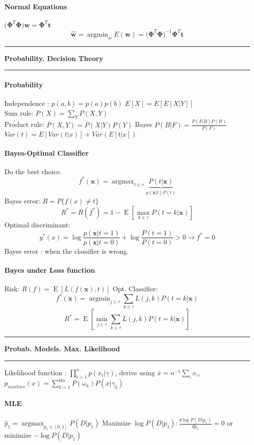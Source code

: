 \documentclass[7pt]{scrartcl}
\newlength{\secskip}
\renewcommand{\section}[1]{
  \hrule\vspace{.1em}
  \textbf{#1}
  \hrule
}
\DeclareMathOperator*{\argmax}{argmax}
\DeclareMathOperator*{\argmin}{argmin}
\DeclareMathOperator{\E}{E}
\renewcommand{\vec}{\mathbf}
\begin{document}
\begin{multicols}{4}
\paragraph{Normal Equations}
$ \vec{(\Phi}^{T}\vec{\Phi) w = \Phi}^{T} \vec{t}$
\[ \hat{\vec{w}} = \argmin_w E(\vec{w}) = \vec{(\Phi}^{T}\vec{\Phi)}^{-1} \vec{\Phi}^{T}  \vec{t} \]

\section{Probability. Decision Theory}
\paragraph{Probability}
Independence : $p(a,b)=p(a)p(b)$
$E[X] = E[E[X|Y]]$ \\
Sum rule: $P(X) = \sum_Y P(X,Y)$\\
Product rule: $P(X,Y) = P(X|Y)P(Y)$
Bayes $P(B|F) = \frac{P(F|B)P(B)}{P(F)}$ \\
$Var(t) = E[Var(t|x)] + Var(E[t|x])$
\paragraph{Bayes-Optimal Classifier} Do the best choice.
\[f^*(\vec x) = \argmax_{t \in \tau} \underbrace{P(t|\vec x)}_{p(\vec x|t) P(t)}\]
Bayes error: $R = P\{f(x) \neq t\}$
\[ R^* = R(f^*) = 1 - \E \left [ \max_{k\in\tau} P(t = k | \vec x) \right ] \]
Optimal discriminant:
\[y^*(x) = \log \frac{p(\vec{x}|t=1)}{p(\vec{x}|t=0)} + \log \frac{P(t=1)}{P(t=0)} > 0 \rightarrow f^*=0\]
Bayes error : when the classifier is wrong.
\paragraph{Bayes under Loss function}
Risk: $ R(f) = \E \left [ L(f(\vec x), t) \right ]$
Opt. Classifier:
\[f^*(\vec x) = \argmin_{j \in \tau} \sum_{k \in \tau} L(j,k) P(t = k | \vec x) \]
\[ R^* = \E \left [ \min_{j\in\tau} \sum_{k \in \tau} L(j,k) P(t = k | \vec x) \right ] \]

\section{Probab. Models. Max. Likelihood}
Likelihood function : $\prod_{i=1}^n p(x_i|\gamma)$, derive using $\bar{x} = n^{-1}\sum_i x_i$, $p_{mixture}(x) = \sum_{k=1}^{blu} P(\omega_k) P(x|\gamma_k)$
\paragraph{MLE} $\hat{p}_1 = \argmax_{p_1 \in [0,1]}P(D|p_1)$ Maximize
$\log P(D|p_1) :  \frac{d \log P(D|p_1)}{dp_1} = 0$ or minimize $-\log
P(D|p_1)$

\end{multicols}
\end{document}
